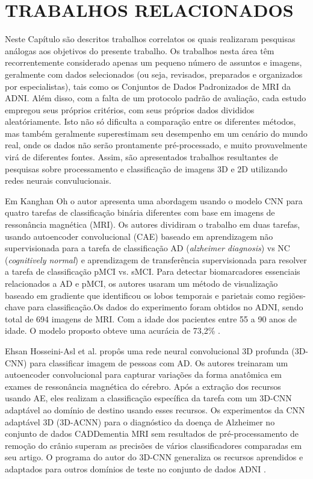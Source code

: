 \documentclass[openright]{UFRGS} %
\begin{document}
\chapter{TRABALHOS RELACIONADOS}

Neste Capítulo são descritos trabalhos correlatos os quais realizaram pesquisas análogas
aos objetivos do presente trabalho. Os trabalhos nesta área têm recorrentemente considerado apenas um pequeno número de assuntos e
imagens, geralmente com dados selecionados (ou seja, revisados, preparados e organizados por especialistas), tais
como os Conjuntos de Dados Padronizados de MRI da ADNI. Além disso, com a falta de um protocolo padrão de avaliação, cada estudo empregou seus próprios critérios, com seus próprios dados divididos aleatóriamente. Isto não só dificulta a comparação entre os diferentes métodos, mas também geralmente
superestimam seu desempenho em um cenário do mundo real, onde os dados não serão prontamente
pré-processado, e muito provavelmente virá de diferentes fontes. 
Assim, são apresentados trabalhos resultantes de pesquisas sobre  processamento e classificação de imagens 3D e 2D utilizando  redes neurais convulucionais.

Em Kanghan Oh o autor apresenta uma abordagem usando o modelo CNN para quatro tarefas de classificação binária diferentes com base em imagens de ressonância magnética (MRI). Os autores dividiram o trabalho em duas tarefas, usando autoencoder convolucional (CAE) baseado em aprendizagem não supervisionada para a tarefa de classificação AD (\textit{alzheimer diagnosis}) vs NC (\textit{cognitively normal}) e aprendizagem de transferência supervisionada para resolver a tarefa de classificação pMCI vs. sMCI. Para detectar biomarcadores essenciais relacionados a AD e pMCI, os autores usaram um método de visualização baseado em gradiente que identificou os lobos temporais e parietais como regiões-chave para classificação.Os dados do experimento foram obtidos no ADNI, sendo total de  694 imagens de MRI. Com a idade dos pacientes entre 55 a 90 anos de idade. O modelo proposto obteve uma acurácia de 73,2\% \cite{oh2019classification}.



Ehsan Hosseini-Asl et al. propôs uma rede neural convolucional 3D profunda (3D-CNN) para classificar imagem de pessoas com AD. Os autores treinaram um autoencoder convolucional para capturar variações da forma anatômica em exames de ressonância magnética do cérebro. Após a extração dos recursos usando AE, eles realizam a classificação específica da tarefa com um 3D-CNN adaptável ao domínio de destino usando esses recursos. Os experimentos da CNN adaptável 3D (3D-ACNN) para o diagnóstico da doença de Alzheimer no conjunto de dados CADDementia MRI sem resultados de pré-processamento de remoção do crânio superam as precisões de vários classificadores comparadas em seu artigo. O programa do autor do 3D-CNN generaliza os recursos aprendidos e adaptados para outros domínios de teste no conjunto de dados ADNI \cite{hosseini2016alzheimer}.
\end{document}
